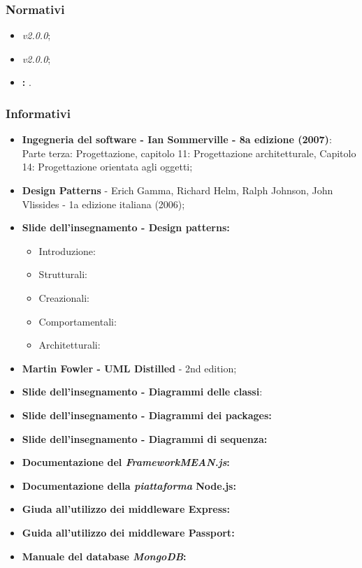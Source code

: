 \subsubsection{Normativi}
\begin{itemize}
	\item \textit{\NdP v2.0.0};
	\item \textit{\AdR v2.0.0};
	\item \textbf{\VE: }.
\end{itemize}
\subsubsection{Informativi}
\begin{itemize}
	\item \textbf{Ingegneria del software - Ian Sommerville - 8a edizione (2007)}: \\
	Parte terza: Progettazione, capitolo 11: Progettazione architetturale, Capitolo 14: Progettazione orientata agli oggetti;
	\item \textbf{Design Patterns} - Erich Gamma, Richard Helm, Ralph Johnson, John Vlissides - 1a edizione italiana (2006);
	\item \textbf{Slide dell'insegnamento - Design patterns:}
	\begin{itemize}
		\item Introduzione:
		\item Strutturali:
		\item Creazionali:
		\item Comportamentali:
		\item Architetturali:
	\end{itemize}
	\item \textbf{Martin Fowler - UML Distilled} - 2nd edition;
	\item \textbf{Slide dell'insegnamento - Diagrammi delle classi}:
	\item \textbf{Slide dell'insegnamento - Diagrammi dei packages:}
	\item \textbf{Slide dell'insegnamento - Diagrammi di sequenza:}
	\item \textbf{Documentazione del \textit{FrameworkMEAN.js}:}
	\item \textbf{Documentazione della \textit{piattaforma} Node.js:}
	\item \textbf{Giuda all'utilizzo dei middleware Express:}
	\item \textbf{Guida all'utilizzo dei middleware Passport:}
	\item \textbf{Manuale del database \textit{MongoDB}:}

\end{itemize}

